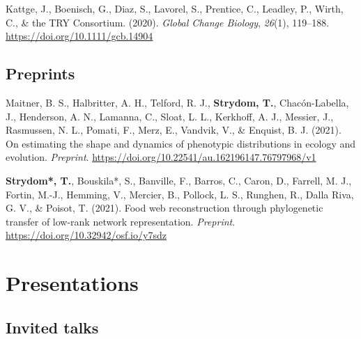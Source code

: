 \documentclass[11pt, a4paper]{awesome-cv}
\begin{document}
\leavevmode\hypertarget{ref-Kattge_2020}{}%
Kattge, J., Boenisch, G., Diaz, S., Lavorel, S., Prentice, C., Leadley,
P., Wirth, C., \& the TRY Consortium. (2020). \emph{Global Change
Biology}, \emph{26}(1), 119--188.
\url{https://doi.org/10.1111/gcb.14904}

\endgroup
\vspace{\baselineskip}

\hypertarget{preprints}{%
\subsection{\texorpdfstring{\textbf{Preprints}}{Preprints}}\label{preprints}}

\begingroup
\setlength{\parindent}{-0.5in}
\setlength{\leftskip}{0.5in}

\hypertarget{refs_review}{}
\leavevmode\hypertarget{ref-MaitnerEstSha2021}{}%
Maitner, B. S., Halbritter, A. H., Telford, R. J., \textbf{Strydom, T.},
Chacón-Labella, J., Henderson, A. N., Lamanna, C., Sloat, L. L.,
Kerkhoff, A. J., Messier, J., Rasmussen, N. L., Pomati, F., Merz, E.,
Vandvik, V., \& Enquist, B. J. (2021). On estimating the shape and
dynamics of phenotypic distributions in ecology and evolution.
\emph{Preprint}. \url{https://doi.org/10.22541/au.162196147.76797968/v1}

\leavevmode\hypertarget{ref-StrydomFooWeb2021}{}%
\textbf{Strydom*, T.}, Bouskila*, S., Banville, F., Barros, C., Caron,
D., Farrell, M. J., Fortin, M.-J., Hemming, V., Mercier, B., Pollock, L.
S., Runghen, R., Dalla Riva, G. V., \& Poisot, T. (2021). Food web
reconstruction through phylogenetic transfer of low-rank network
representation. \emph{Preprint}.
\url{https://doi.org/10.32942/osf.io/y7sdz}

\endgroup

\newpage

\hypertarget{presentations}{%
\section{Presentations}\label{presentations}}

\vspace{\baselineskip}

\hypertarget{invited-talks}{%
\subsection{\texorpdfstring{\textbf{Invited
talks}}{Invited talks}}\label{invited-talks}}
\end{document}

